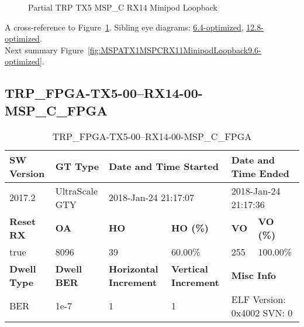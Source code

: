 \begin{figure}[h]
\begin{subfigure}{0.5\textwidth}
\hyperref[sec:TRPFPGATX506RX1406MSPCFPGA9.6-optimized]{}
\end{subfigure}\hspace*{\fill}
\begin{subfigure}{0.5\textwidth}
\hyperref[sec:TRPFPGATX507RX1407MSPCFPGA9.6-optimized]{}
\end{subfigure}

\caption{Partial TRP TX5 MSP\_C RX14 Minipod Loopback} \label{fig:PartialTRPTX5MSPCRX14MinipodLoopback9.6-optimized}
\end{figure}

A cross-reference to Figure~\ref{fig:PartialTRPTX5MSPCRX14MinipodLoopback9.6-optimized}.
Sibling eye diagrams: \hyperref[sec:PartialTRPTX5MSPCRX14MinipodLoopback6.4-optimized]{6.4-optimized}, \hyperref[sec:PartialTRPTX5MSPCRX14MinipodLoopback12.8-optimized]{12.8-optimized}. \\
Next summary Figure~\ref{fig:MSPATX1MSPCRX11MinipodLoopback9.6-optimized}.
\clearpage
% 
\subsection{TRP\_FPGA-TX5-00--RX14-00-MSP\_C\_FPGA}\label{sec:TRPFPGATX500RX1400MSPCFPGA9.6-optimized}

\begin{table}[h]
\centering
\caption{TRP\_FPGA-TX5-00--RX14-00-MSP\_C\_FPGA}
\label{tab:TRPFPGATX500RX1400MSPCFPGA9.6-optimized}
\begin{tabular}{@{}|l|l|l|l|l|l|@{}}
\toprule
\textbf{SW Version}                & \textbf{GT Type}   & \multicolumn{2}{l|}{\textbf{Date and Time Started}}            & \multicolumn{2}{l|}{\textbf{Date and Time Ended}}        \\ \midrule
2017.2                       & UltraScale GTY          & \multicolumn{2}{l|}{2018-Jan-24 21:17:07}                   & \multicolumn{2}{l|}{2018-Jan-24 21:17:36}               \\ \midrule
\textbf{Reset RX}                  & \textbf{OA} & \textbf{HO}   & \textbf{HO (\%)} & \textbf{VO} & \textbf{VO (\%)} \\ \midrule
true & 8096        & 39          & 60.00\%        & 255        & 100.00\%       \\ \midrule
\textbf{Dwell Type}                & \textbf{Dwell BER} & \textbf{Horizontal Increment} & \textbf{Vertical Increment}    & \multicolumn{2}{l|}{\textbf{Misc Info}}                  \\ \midrule
BER                            & 1e-7        & 1        & 1           & \multicolumn{2}{l|}{ELF Version: 0x4002 SVN: 0}                         \\ \bottomrule
\end{tabular}
\end{table}

